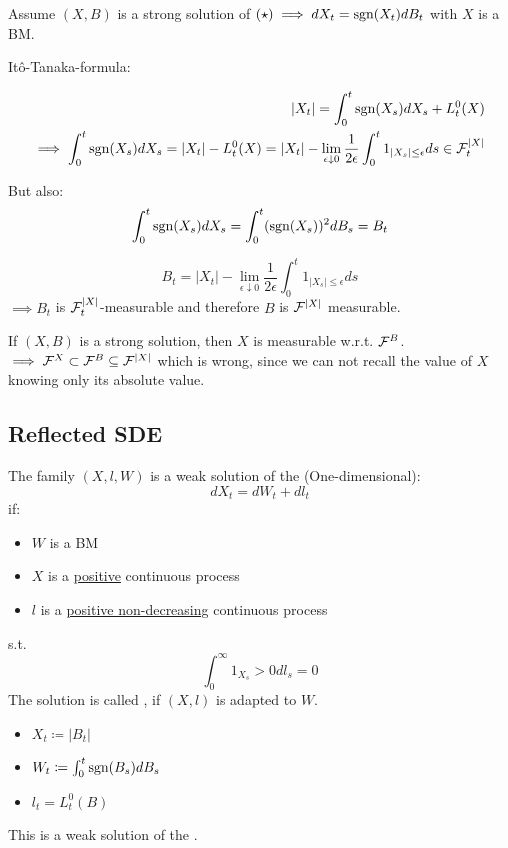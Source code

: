 Assume $(X,B)$ is a strong solution of $(\star)\implies dX_t=\text{sgn}(X_t)dB_t$ with $X$ is a BM. 

Itô-Tanaka-formula:

\begin{align*}
    |X_t|=\int_0^t\text{sgn}(X_s)dX_s+L_t^0(X)\\
    \implies \int_0^t\text{sgn}(X_s)dX_s=|X_t|-L_t^0(X)=|X_t|-\lim_{\epsilon\downarrow 0}\frac{1}{2\epsilon}\int_0^t 1_{|X_s|\leq \epsilon}ds\in \mathcal{F}_t^{|X|}
\end{align*}

But also: 
\begin{align*}
    \int_0^t \text{sgn}(X_s)dX_s = \int_0^t(\text{sgn}(X_s))^2 d B_s=B_t
\end{align*}

\[B_t=|X_t|-\lim_{\epsilon\downarrow 0}\frac{1}{2\epsilon}\int_0^t1_{|X_s|\leq \epsilon}ds\]
$\implies B_t$ is $\mathcal{F}_t^{|X|}$-measurable and therefore $B$ is $\mathcal{F}^{|X|}$ measurable.


If $(X,B)$ is a strong solution, then $X$ is measurable w.r.t. $\mathcal{F}^B$.
$\implies \mathcal{F}^X\subset \mathcal{F}^B\subseteq \mathcal{F}^{|X|}$
which is wrong, since we can not recall the value of $X$ knowing only its absolute value.

\subsection{Reflected SDE}

\begin{definition}\label{def:3.7}
    The family $(X,l,W)$ is a weak solution of the  (One-dimensional):
    \[dX_t=dW_t+dl_t\]
    if: 
    \begin{itemize}
        \item $W$ is a BM 
        \item $X$ is a \underline{positive} continuous process 
        \item $l$ is a \underline{positive non-decreasing} continuous process 
    \end{itemize}
    s.t. 
    \[\int_0^\infty 1_{X_s}>0d l_s=0\]
    The solution is called , if $(X,l)$ is adapted to $W$.
\end{definition}

\begin{aexample}
    \begin{itemize}
        \item $X_t\coloneqq |B_t|$
        \item $W_t\coloneqq \int_0^t\text{sgn}(B_s)dB_s$
        \item $l_t=L_t^0(B)$
    \end{itemize}
    This is a weak solution of the . 
\end{aexample}

